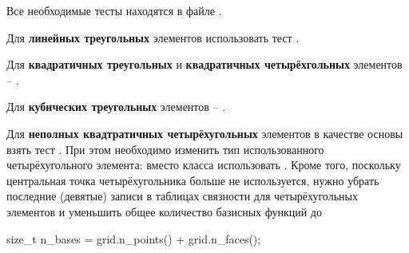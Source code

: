 Все необходимые тесты находятся в файле .

Для {\bf линейных треугольных} элементов использовать тест .

Для {\bf квадратичных треугольных} и {\bf квадратичных четырёхгольных} элементов -- .

Для {\bf кубических треугольных} элементов -- .

Для {\bf неполных квадтратичных четырёхугольных} элементов в качестве основы взять тест .
При этом необходимо изменить тип использованного четырёхугольного элемента: вместо
класса  использовать .
Кроме того, поскольку центральная точка четырёхугольника больше не используется, нужно
убрать последние (девятые) записи в таблицах связности  для четырёхугольных элементов и
уменьшить общее количество базисных функций до
\begin{cppcode}
size_t n_bases = grid.n_points() + grid.n_faces();
\end{cppcode}

